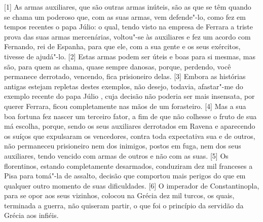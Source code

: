 {[}1{]} As armas auxiliares, que são outras armas inúteis, são as que se
têm quando se chama um poderoso que, com as suas armas, vem defende"-lo,
como fez em tempos recentes o papa Júlio: o qual, tendo visto na empresa
de Ferrara a triste prova das suas armas mercenárias, voltou"-se às
auxiliares e fez um acordo com Fernando, rei de Espanha, para que
ele, com a sua gente e os seus exércitos, tivesse de ajudá"-lo. {[}2{]} Estas
armas podem ser úteis e boas para si mesmas, mas são, para quem as
chama, quase sempre danosas, porque, perdendo, você permanece derrotado,
vencendo, fica prisioneiro delas. {[}3{]} Embora as histórias antigas
estejam repletas destes exemplos, não desejo, todavia, afastar"-me do
exemplo recente do papa Júlio , cuja decisão não poderia ser mais
insensata, por querer Ferrara, ficou completamente nas mãos de um
forasteiro. {[}4{]} Mas a sua boa fortuna fez nascer um terceiro fator,
a fim de que não colhesse o fruto de sua má escolha, porque, sendo os
seus auxiliares derrotados em Ravena e aparecendo os suíços que expulsaram os vencedores,
contra toda expectativa sua e de outros, não permaneceu prisioneiro nem
dos inimigos, postos em fuga, nem dos seus auxiliares, tendo vencido com
armas de outros e não com as suas. {[}5{]} Os florentinos, estando
completamente desarmados, conduziram dez mil franceses a Pisa para tomá"-la de assalto, decisão que
comportou mais perigos do que em qualquer outro momento de suas
dificuldades. {[}6{]} O imperador de Constantinopla, para se opor aos seus vizinhos,
colocou na Grécia
dez mil turcos, os quais, terminada a guerra, não quiseram partir, o que
foi o princípio da servidão da Grécia aos infiéis.

